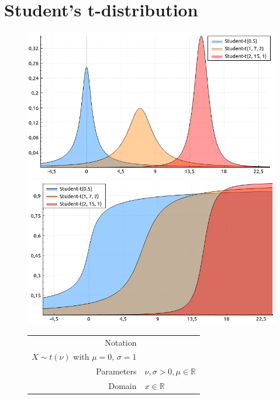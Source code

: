 \documentclass[a4paper,11pt]{article}
\theoremstyle{plain}
\theoremstyle{definition}
\newcommand{\MR}{\mathbb{R}}
\begin{document}
\section{Student's t-distribution}
	\begin{figure}[!htb]\centering
		\begin{minipage}{0.55\textwidth}
			\includegraphics[width=\linewidth, right]{student_t_pdf}
			\captionsetup{labelformat=empty}
			\includegraphics[width=\linewidth, right]{student_t_cdf}
			\captionsetup{labelformat=empty}
		\end{minipage}
		\begin{minipage}{0.4\textwidth}
			\begin{tabular}{| r | l |}
				\hline
				Notation & \pbox{\linewidth}{$X \sim t(\nu, \mu, \sigma)$, \\ $X \sim t(\nu)$ with $\mu=0$, $\sigma=1$} \\
				\hline
				Parameters & $\nu, \sigma > 0, \mu \in \MR$ \\
				\hline
				Domain & $x \in \MR$\\

\end{tabular}
\end{minipage}
\end{figure}
\end{document}
